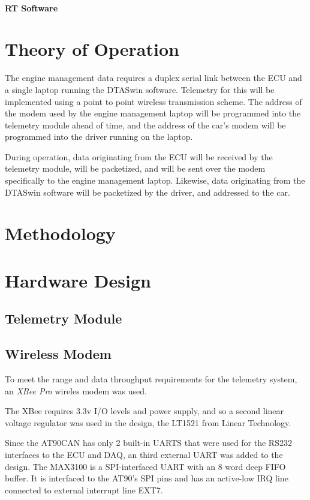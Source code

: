 \paragraph*{RT Software}

\section{Theory of Operation}

The engine management data requires a duplex serial link between the
ECU and a single laptop running the DTASwin software. Telemetry for
this will be implemented using a point to point wireless transmission
scheme. The address of the modem used by the engine management laptop
will be programmed into the telemetry module ahead of time, and the
address of the car's modem will be programmed into the driver running
on the laptop.

During operation, data originating from the ECU will be received by
the telemetry module, will be packetized, and will be sent over the
modem specifically to the engine management laptop. Likewise, data
originating from the DTASwin software will be packetized by the driver,
and addressed to the car.

\section{Methodology}
\label{sec:methodology}

\section{Hardware Design}

\subsection{Telemetry Module}

\subsection{Wireless Modem}

To meet the range and data throughput requirements for the telemetry
system, an \emph{XBee Pro} wireles modem was used.

The XBee requires 3.3v I/O levels and power supply, and so a second
linear voltage regulator was used in the design, the LT1521 from Linear
Technology.

Since the AT90CAN has only 2 built-in UARTS that were used for the
RS232 interfaces to the ECU and DAQ, an third external UART was added
to the design. The MAX3100 is a SPI-interfaced UART with an 8 word
deep FIFO buffer. It is interfaced to the AT90's SPI pins and has
an active-low IRQ line connected to external interrupt line EXT7.

